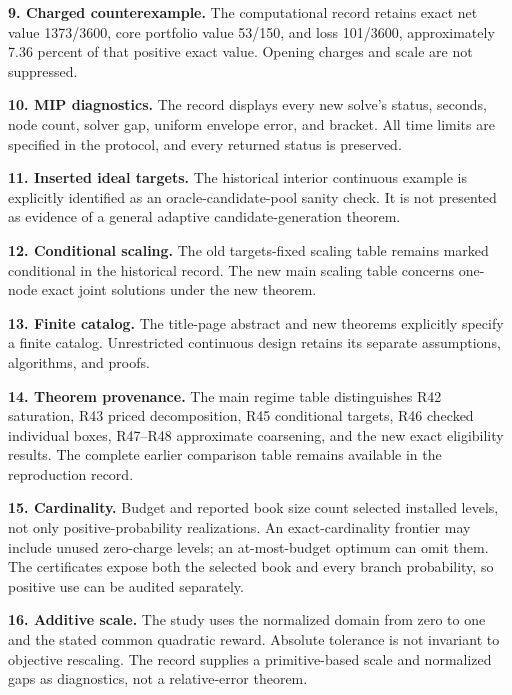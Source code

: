 \documentclass[11pt,letterpaper]{article}
\begin{document}
\textbf{9. Charged counterexample.} The computational record retains exact net value 1373/3600, core portfolio value 53/150, and loss 101/3600, approximately 7.36 percent of that positive exact value. Opening charges and scale are not suppressed.



\textbf{10. MIP diagnostics.} The record displays every new solve's status, seconds, node count, solver gap, uniform envelope error, and bracket. All time limits are specified in the protocol, and every returned status is preserved.



\textbf{11. Inserted ideal targets.} The historical interior continuous example is explicitly identified as an oracle-candidate-pool sanity check. It is not presented as evidence of a general adaptive candidate-generation theorem.



\textbf{12. Conditional scaling.} The old targets-fixed scaling table remains marked conditional in the historical record. The new main scaling table concerns one-node exact joint solutions under the new theorem.



\textbf{13. Finite catalog.} The title-page abstract and new theorems explicitly specify a finite catalog. Unrestricted continuous design retains its separate assumptions, algorithms, and proofs.



\textbf{14. Theorem provenance.} The main regime table distinguishes R42 saturation, R43 priced decomposition, R45 conditional targets, R46 checked individual boxes, R47–R48 approximate coarsening, and the new exact eligibility results. The complete earlier comparison table remains available in the reproduction record.



\textbf{15. Cardinality.} Budget and reported book size count selected installed levels, not only positive-probability realizations. An exact-cardinality frontier may include unused zero-charge levels; an at-most-budget optimum can omit them. The certificates expose both the selected book and every branch probability, so positive use can be audited separately.



\textbf{16. Additive scale.} The study uses the normalized domain from zero to one and the stated common quadratic reward. Absolute tolerance is not invariant to objective rescaling. The record supplies a primitive-based scale and normalized gaps as diagnostics, not a relative-error theorem.
\end{document}

